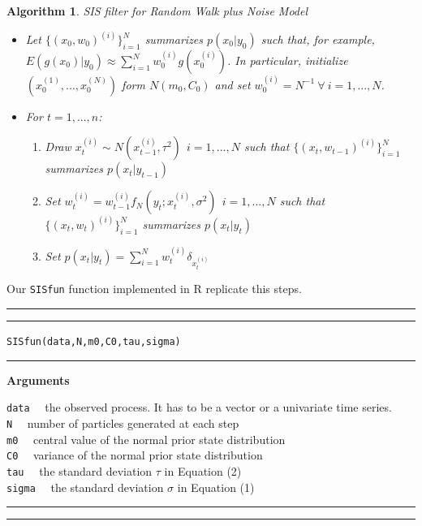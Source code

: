 \documentclass[
]{book}
\theoremstyle{break}
\theoremstyle{nonumberplain}
\newtheorem{algorithm}{Algorithm}[section]
\begin{document}
\begin{algorithm} SIS filter for Random Walk plus Noise Model
\begin{itemize}
\item Let $\{(x_{0},w_{0})^{(i)}\}_{i=1}^{N}$ summarizes $p(x_{0}|y_{0})$ such that, for example, $E(g(x_{0})|y_{0}) \approx \sum_{i=1}^{N}w_{0}^{(i)}g(x_{0}^{(i)})$. In particular, initialize $(x_{0}^{(1)},...,x_{0}^{(N)})$ form $N(m_{0},C_{0})$ and set $w_{0}^{(i)}=N^{-1} \ \forall \ i=1,...,N$.
\item For $t=1,...,n$:
\begin{enumerate}
\item Draw $x_{t}^{(i)} \sim N(x_{t-1}^{(i)},\tau^2) \ \ i=1,...,N$ such that $\{(x_{t},w_{t-1})^{(i)}\}_{i=1}^{N}$ summarizes $p(x_{t}|y_{t-1})$
\item Set $w_{t}^{(i)} = w_{t-1}^{(i)}f_{N}(y_{t};x_{t}^{(i)},\sigma^2) \ \ i=1,...,N$ such that $\{(x_{t},w_{t})^{(i)}\}_{i=1}^{N}$ summarizes $p(x_{t}|y_{t})$
\item Set $p(x_{t}|y_{t})=\sum_{i=1}^{N}w_{t}^{(i)}\delta_{x_{t}^{(i)}}$
\end{enumerate}
\end{itemize}
\end{algorithm}

Our \texttt{SISfun} function implemented in R replicate this steps.\\

\hrule
\hrule
\texttt{SISfun(data,N,m0,C0,tau,sigma)}
\hrule

\textbf{Arguments}

\texttt{data} ~~the observed process. It has to be a vector or a
univariate time series.\\
\texttt{N} ~~number of particles generated at each step\\
\texttt{m0} ~~central value of the normal prior state distribution\\
\texttt{C0} ~~variance of the normal prior state distribution\\
\texttt{tau} ~~the standard deviation \(\tau\) in Equation (2)\\
\texttt{sigma} ~~the standard deviation \(\sigma\) in Equation (1)

\hrule
\hrule
\end{document}
